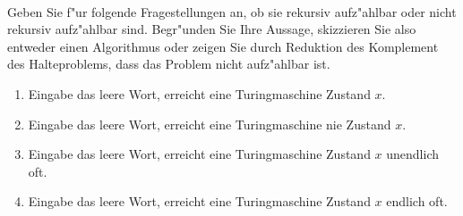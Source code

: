 \documentclass[a4paper]{article}
\begin{document}
\bigskip

\smallskip\\
Geben Sie f"ur folgende Fragestellungen an, ob sie rekursiv aufz"ahlbar oder nicht rekursiv aufz"ahlbar sind. Begr"unden Sie Ihre Aussage, skizzieren Sie also entweder einen Algorithmus oder zeigen Sie durch Reduktion des Komplement des Halteproblems, dass das Problem nicht aufz"ahlbar ist.
\begin{enumerate}
\item Eingabe das leere Wort, erreicht eine Turingmaschine Zustand $x$.
\item Eingabe das leere Wort, erreicht eine Turingmaschine nie Zustand $x$.
\item Eingabe das leere Wort, erreicht eine Turingmaschine Zustand $x$ unendlich oft.
\item Eingabe das leere Wort, erreicht eine Turingmaschine Zustand $x$ endlich oft.
\end{enumerate}
\end{document}
